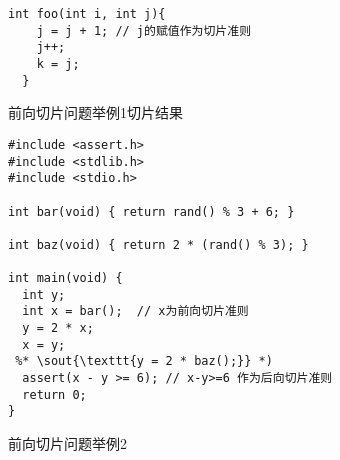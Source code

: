 \begin{figure}[t]
\begin{center}
\begin{lstlisting}[language={[ANSI]C}]
  int foo(int i, int j){
    j = j + 1; // j的赋值作为切片准则
    j++;
    k = j;
  }
\end{lstlisting}
\vspace{-16pt}
\caption{前向切片问题举例1\cndash 切片结果}
\label{fig:fwd_issue1_res}
\end{center}
\end{figure}

\begin{figure}[t]
\begin{center}
\begin{lstlisting}[language={[ANSI]C}]
#include <assert.h>
#include <stdlib.h>
#include <stdio.h>

int bar(void) { return rand() % 3 + 6; }

int baz(void) { return 2 * (rand() % 3); }

int main(void) {
  int y;
  int x = bar();  // x为前向切片准则
  y = 2 * x;
  x = y;
 %* \sout{\texttt{y = 2 * baz();}} *)
  assert(x - y >= 6); // x-y>=6 作为后向切片准则
  return 0;
}

\end{lstlisting}
\vspace{-16pt}
\caption{前向切片问题举例2}
\label{fig:fwd_issue2}
\end{center}
\end{figure}
